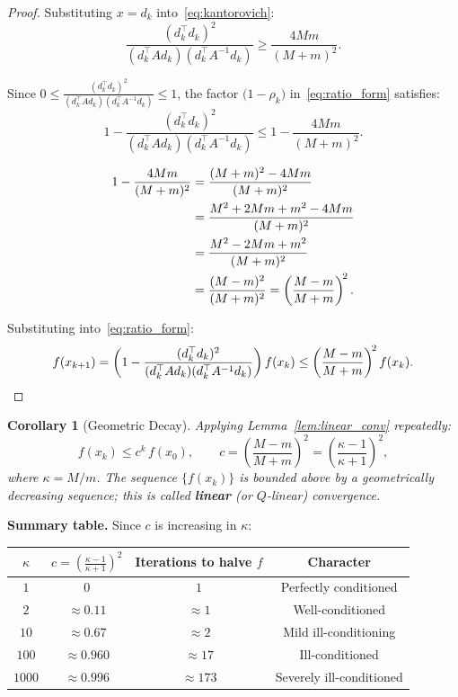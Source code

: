 \documentclass[11pt]{article}
\theoremstyle{definition}
\theoremstyle{plain}
\newtheorem{corollary}{Corollary}
\begin{document}
\begin{proof}

Substituting $x = d_k$ into~\eqref{eq:kantorovich}:
\[
  \frac{(d_k^\top d_k)^2}{(d_k^\top Ad_k)(d_k^\top A^{-1}d_k)} \geq \frac{4Mm}{(M+m)^2}.
\]

Since $0 \leq \frac{(d_k^\top d_k)^2}{(d_k^\top Ad_k)(d_k^\top A^{-1}d_k)} \leq 1$,
the factor $\bigl(1 - \rho_k\bigr)$ in~\eqref{eq:ratio_form} satisfies:
\[
  1 - \frac{(d_k^\top d_k)^2}{(d_k^\top Ad_k)(d_k^\top A^{-1}d_k)}
  \leq 1 - \frac{4Mm}{(M+m)^2}.
\]

\begin{align}
  1 - \frac{4Mm}{(M+m)^2}
  &= \frac{(M+m)^2 - 4Mm}{(M+m)^2} \notag\\
  &= \frac{M^2 + 2Mm + m^2 - 4Mm}{(M+m)^2} \notag\\
  &= \frac{M^2 - 2Mm + m^2}{(M+m)^2} \notag\\
  &= \frac{(M-m)^2}{(M+m)^2}
   = \left(\frac{M-m}{M+m}\right)^{\!2}. \label{eq:c_derivation}
\end{align}


Substituting into~\eqref{eq:ratio_form}:
\[
  f(x_{k+1})
  = \left(1 - \frac{(d_k^\top d_k)^2}{(d_k^\top Ad_k)(d_k^\top A^{-1}d_k)}\right)f(x_k)
  \leq \left(\frac{M-m}{M+m}\right)^{\!2}f(x_k). \qedhere
\]
\end{proof}

\begin{corollary}[Geometric Decay]\label{cor:geometric}
Applying Lemma~\ref{lem:linear_conv} repeatedly:
\[
  f(x_k) \leq c^k\,f(x_0), \qquad c = \left(\frac{M-m}{M+m}\right)^{\!2}
  = \left(\frac{\kappa-1}{\kappa+1}\right)^{\!2},
\]
where $\kappa=M/m$. The sequence $\{f(x_k)\}$ is bounded above by a geometrically
decreasing sequence; this is called \textbf{linear} (or $Q$-linear) convergence.
\end{corollary}

\noindent\textbf{Summary table.} Since $c$ is increasing in $\kappa$:

\begin{center}
\begin{tabular}{cccc}
\toprule
$\kappa$ & $c=\left(\frac{\kappa-1}{\kappa+1}\right)^2$ & Iterations to halve $f$ & Character\\
\midrule
$1$    & $0$       & $1$     & Perfectly conditioned \\
$2$    & $\approx 0.11$ & $\approx 1$  & Well-conditioned \\
$10$   & $\approx 0.67$ & $\approx 2$  & Mild ill-conditioning \\
$100$  & $\approx 0.960$ & $\approx 17$ & Ill-conditioned \\
$1000$ & $\approx 0.996$ & $\approx 173$ & Severely ill-conditioned \\
\bottomrule
\end{tabular}
\end{center}
\end{document}
